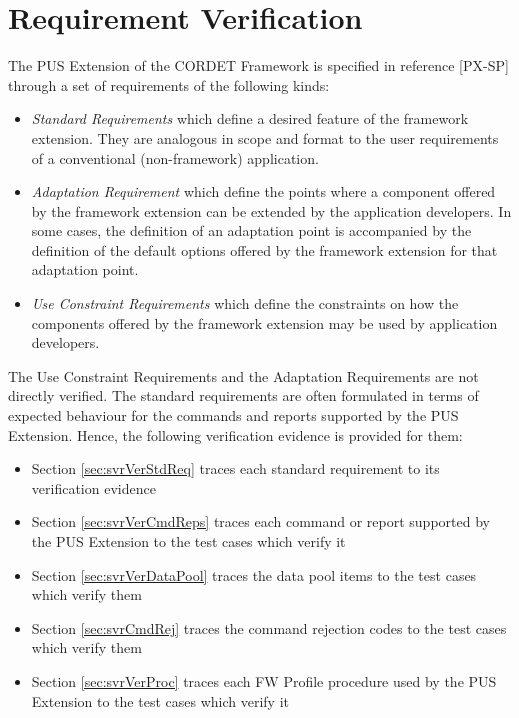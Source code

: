 \documentclass{pnp_article}
\begin{document}
\section{Requirement Verification}\label{sec:svrReqVer} 
The PUS Extension of the CORDET Framework is specified in reference [PX-SP] through a set of requirements of the following kinds:

\begin{itemize}
\item{} \textit{Standard Requirements} which define a desired feature of the framework extension. They are analogous in scope and format to the user requirements of a conventional (non-framework) application.
\item{} \textit{Adaptation Requirement} which define the points where a component offered by the framework extension can be extended by the application developers. In some cases, the definition of an adaptation point is accompanied by the definition of the default options offered by the framework extension for that adaptation point.  
\item{} \textit{Use Constraint Requirements} which define the constraints on how the components offered by the framework extension may be used by application developers.
\end{itemize}

The Use Constraint Requirements and the Adaptation Requirements are not directly verified. The standard requirements are often formulated in terms of expected behaviour for the commands and reports supported by the PUS Extension. Hence, the following verification evidence is provided for them:

\begin{itemize}
\item Section \ref{sec:svrVerStdReq} traces each standard requirement to its verification evidence
\item Section \ref{sec:svrVerCmdReps} traces each command or report supported by the PUS Extension to the test cases which verify it
\item Section \ref{sec:svrVerDataPool} traces the data pool items to the test cases which verify them
\item Section \ref{sec:svrCmdRej} traces the command rejection codes to the test cases which verify them
\item Section \ref{sec:svrVerProc} traces each FW Profile procedure used by the PUS Extension to the test cases which verify it
\end{itemize}
\end{document}

